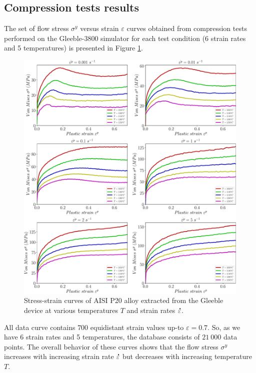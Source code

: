 \documentclass[twoside,english,1p,final,sort&compress]{elsarticle}
\theoremstyle{plain}
\DeclareRobustCommand{\mdot}[1]{\accentset{\mbox{\bfseries .}}{#1}}
\begin{document}
\subsection{Compression tests results\label{sec:ComTestResults}}

The set of flow stress $\sigma^y$ versus strain $\varepsilon$ curves obtained from compression tests performed on the Gleeble-3800 simulator for each test condition (6 strain rates and 5 temperatures) is presented in Figure \ref{fig:RawData}.
\begin{figure}[!ht]
\centering
\includegraphics[width=\columnwidth]{Figures/rawData}
\caption{Stress-strain curves of AISI P20 alloy extracted from the Gleeble device at various temperatures $T$ and strain rates $\mdot\varepsilon$.}
\label{fig:RawData}
\end{figure}
All data curve contains $700$ equidistant strain values up-to $\varepsilon=0.7$.
So, as we have 6 strain rates and 5 temperatures, the database consists of $21~000$ data points.
The overall behavior of these curves shows that the flow stress $\sigma^y$ increases with increasing strain rate $\mdot\varepsilon$ but decreases with increasing temperature $T$.
\end{document}
